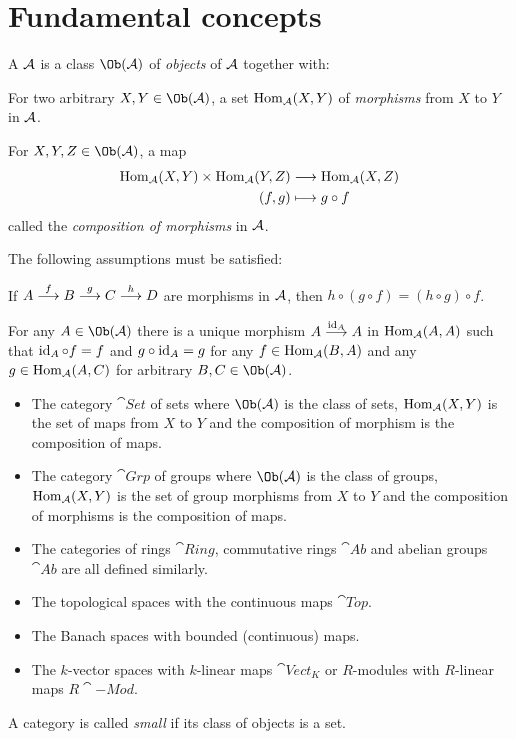\documentclass[a4paper,parskip=half,numbers=enddot, DIV=12]{scrreprt}
\begin{document}
\section{Fundamental concepts}
\begin{defi}[category]
	A  $\mathcal{A}$ is a class $\Ob(\Aa)$ of \emph{objects} of $\mathcal{A}$ together with:
	\begin{alphanumerate}
	    \item 
	        For two arbitrary $X,Y\in \Ob(\Aa)$, a set $\operatorname{Hom}_{\mathcal{A}}(X,Y)$ of \emph{morphisms} from $X$ to $Y$ in $\mathcal{A}$.
	    \item 
	        For $X,Y,Z\in\Ob(\Aa)$, a map 
	        \begin{align*}
	            \operatorname{Hom}_{\mathcal{A}}(X,Y)\times \operatorname{Hom}_{\mathcal{A}}(Y,Z) &\longrightarrow \operatorname{Hom}_{\mathcal{A}}(X,Z)\\
	            (f,g) &\longmapsto g\circ f
	        \end{align*}
	        called the \emph{composition of morphisms} in $\mathcal{A}$.
	\end{alphanumerate}
	The following assumptions must be satisfied:
	\begin{rmnumerate}
	    \item
	        If $A\morphism[f] B \morphism[g] C\morphism[h] D$ are morphisms in $\mathcal{A}$, then $h\circ(g\circ f) = (h\circ g)\circ f$.
	    \item
	        For any $A\in\Ob(\Aa)$ there is a unique morphism $A\morphism[\id_A] A$ in $\operatorname{Hom}_{\mathcal{A}}(A,A)$ such that $\operatorname{id}_A \circ f = f$ and $g\circ \operatorname{id}_A = g$ for any $f\in \operatorname{Hom}_{\mathcal{A}}(B,A)$ and any $g\in \operatorname{Hom}_{\mathcal{A}}(A,C)$ for arbitrary $B,C\in \Ob(\Aa)$.
	\end{rmnumerate}
\end{defi}
\begin{example}
    \begin{itemize}
        \item 
            The category $\cat{Set}$ of sets where $\Ob(\Aa)$ is the class of sets, $\operatorname{Hom}_{\mathcal{A}}(X,Y)$ is the set of maps from $X$ to $Y$ and the composition of morphism is the composition of maps.
        \item 
            The category $\cat{Grp}$ of groups where $\Ob(\Aa)$ is the class of groups, $\operatorname{Hom}_{\mathcal{A}}(X,Y)$ is the set of group morphisms from $X$ to $Y$ and the composition of morphisms is the composition of maps.
        \item 
            The categories of rings $\cat{Ring}$, commutative rings $\cat{Ab}$ and abelian groups $\cat{Ab}$ are all defined similarly.
        \item 
            The topological spaces with the continuous maps $\cat{Top}$.
        \item 
            The Banach spaces with bounded (continuous) maps.
        \item 
            The $k$-vector spaces with $k$-linear maps $\cat{Vect}_K$ or $R$-modules with $R$-linear maps $R\cat{-Mod}$.
    \end{itemize}
\end{example}
A category is called \emph{small} if its class of objects is a set.
\end{document}
